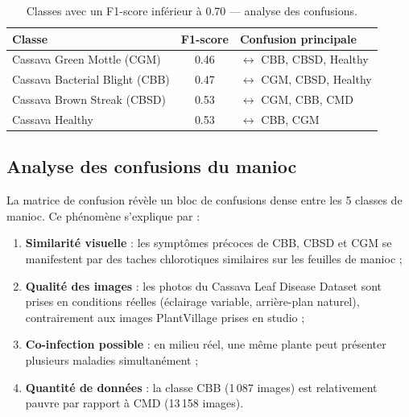 \documentclass[12pt, a4paper, twoside]{report}
\begin{document}
\begin{table}[H]
\centering
\caption{Classes avec un F1-score inférieur à 0.70 — analyse des confusions.}
\label{tab:weak-classes}
\begin{tabular}{lcl}
\toprule
\textbf{Classe}                    & \textbf{F1-score} & \textbf{Confusion principale} \\
\midrule
Cassava Green Mottle (CGM)         & 0.46 & $\leftrightarrow$ CBB, CBSD, Healthy \\
Cassava Bacterial Blight (CBB)     & 0.47 & $\leftrightarrow$ CGM, CBSD, Healthy \\
Cassava Brown Streak (CBSD)        & 0.53 & $\leftrightarrow$ CGM, CBB, CMD \\
Cassava Healthy                    & 0.53 & $\leftrightarrow$ CBB, CGM \\
\bottomrule
\end{tabular}
\end{table}

\subsection{Analyse des confusions du manioc}

La matrice de confusion révèle un bloc de confusions dense entre les 5 classes de manioc. Ce phénomène s'explique par :

\begin{enumerate}
    \item \textbf{Similarité visuelle} : les symptômes précoces de CBB, CBSD et CGM se manifestent par des taches chlorotiques similaires sur les feuilles de manioc ;
    \item \textbf{Qualité des images} : les photos du Cassava Leaf Disease Dataset sont prises en conditions réelles (éclairage variable, arrière-plan naturel), contrairement aux images PlantVillage prises en studio ;
    \item \textbf{Co-infection possible} : en milieu réel, une même plante peut présenter plusieurs maladies simultanément ;
    \item \textbf{Quantité de données} : la classe CBB (1\,087 images) est relativement pauvre par rapport à CMD (13\,158 images).
\end{enumerate}

\end{document}
